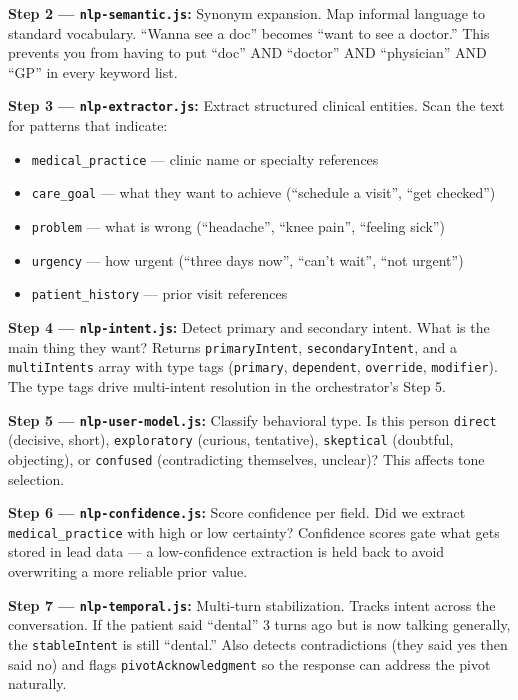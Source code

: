\documentclass[12pt, a4paper]{report}
\newcommand{\ic}[1]{\texttt{\small\color{accentblue!70!black}#1}}
\begin{document}
\textbf{Step 2 --- \ic{nlp-semantic.js}:} Synonym expansion. Map informal language to
standard vocabulary. ``Wanna see a doc'' becomes ``want to see a doctor.'' This prevents
you from having to put ``doc'' AND ``doctor'' AND ``physician'' AND ``GP'' in every
keyword list.

\textbf{Step 3 --- \ic{nlp-extractor.js}:} Extract structured clinical entities. Scan
the text for patterns that indicate:
\begin{itemize}
  \item \ic{medical\_practice} --- clinic name or specialty references
  \item \ic{care\_goal} --- what they want to achieve (``schedule a visit'', ``get
        checked'')
  \item \ic{problem} --- what is wrong (``headache'', ``knee pain'', ``feeling sick'')
  \item \ic{urgency} --- how urgent (``three days now'', ``can't wait'', ``not urgent'')
  \item \ic{patient\_history} --- prior visit references
\end{itemize}

\textbf{Step 4 --- \ic{nlp-intent.js}:} Detect primary and secondary intent. What is
the main thing they want? Returns \ic{primaryIntent}, \ic{secondaryIntent}, and a
\ic{multiIntents} array with type tags (\ic{primary}, \ic{dependent}, \ic{override},
\ic{modifier}). The type tags drive multi-intent resolution in the orchestrator's Step 5.

\textbf{Step 5 --- \ic{nlp-user-model.js}:} Classify behavioral type. Is this person
\ic{direct} (decisive, short), \ic{exploratory} (curious, tentative), \ic{skeptical}
(doubtful, objecting), or \ic{confused} (contradicting themselves, unclear)? This
affects tone selection.

\textbf{Step 6 --- \ic{nlp-confidence.js}:} Score confidence per field. Did we extract
\ic{medical\_practice} with high or low certainty? Confidence scores gate what gets
stored in lead data --- a low-confidence extraction is held back to avoid overwriting a
more reliable prior value.

\textbf{Step 7 --- \ic{nlp-temporal.js}:} Multi-turn stabilization. Tracks intent
across the conversation. If the patient said ``dental'' 3 turns ago but is now talking
generally, the \ic{stableIntent} is still ``dental.'' Also detects contradictions (they
said yes then said no) and flags \ic{pivotAcknowledgment} so the response can address
the pivot naturally.
\end{document}
